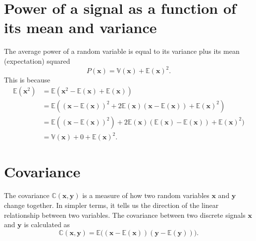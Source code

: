 
\section{Power of a signal as a function of its mean and variance}
The average power of a random variable is equal to its variance plus its mean
(expectation) squared
\begin{equation}
  P(\mathbf{x}) =  \mathbb{V}(\mathbf{x}) + \mathbb{E}(\mathbf{x})^2.
  \label{eq:power_mean_variance}
\end{equation}
This is because
\begin{align*}
  \mathbb{E}(\mathbf{x}^2)
  & = \mathbb{E}(\mathbf{x}^2 - \mathbb{E}(\mathbf{x}) + \mathbb{E}(\mathbf{x})) \\
  & = \mathbb{E}((\mathbf{x} - \mathbb{E}(\mathbf{x}))^2 + 2\mathbb{E}(\mathbf{x})(\mathbf{x}-\mathbb{E}(\mathbf{x})) + \mathbb{E}(\mathbf{x})^2) \\
  & = \mathbb{E}((\mathbf{x}-\mathbb{E}(\mathbf{x}))^2) + 2\mathbb{E}(\mathbf{x})(\mathbb{E}(\mathbf{x})-\mathbb{E}(\mathbf{x})) + \mathbb{E}(\mathbf{x})^2) \\
  & = \mathbb{V}(\mathbf{x}) + 0 + \mathbb{E}(\mathbf{x})^2.
\end{align*}

\section{Covariance}
\label{sec:covariance}

The covariance $\mathbb{C}(\mathbf{x}, \mathbf{y})$ is a measure of
how two random variables $\mathbf{x}$ and $\mathbf{y}$ change
together. In simpler terms, it tells us the direction of the linear
relationship between two variables. The covariance between two
discrete signals $\mathbf{x}$ and $\mathbf{y}$ is calculated as
\begin{equation}
  \mathbb{C}(\textbf{x}, \textbf{y}) = \mathbb{E}\big((\mathbf{x}-\mathbb{E}(\mathbf{x}))(\mathbf{y}-\mathbb{E}(\mathbf{y}))\big).
\end{equation}

